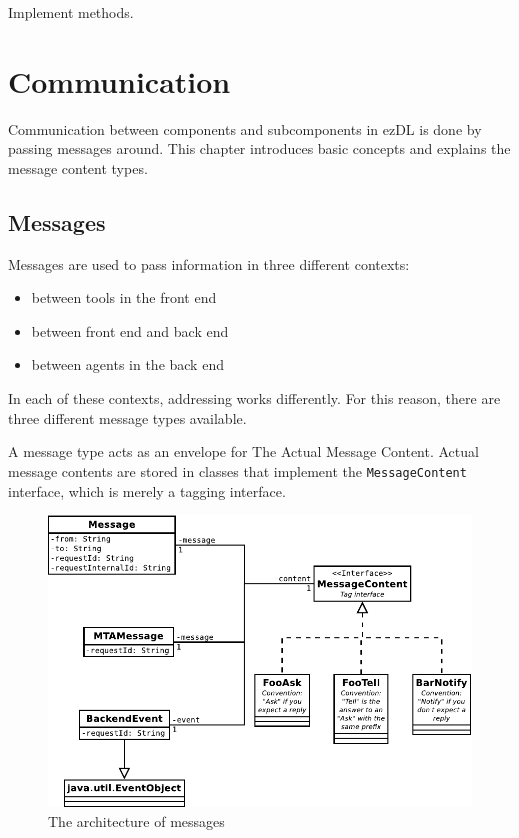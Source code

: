 \documentclass[12pt]{book}
\begin{document}
Implement methods.










%
%
%
%
%
\chapter{Communication}

Communication between components and subcomponents in ezDL is done by passing messages around. This chapter introduces basic concepts and explains the message content types.




\section{Messages\label{sec:communication:messages}}

Messages are used to pass information in three different contexts:

\begin{itemize}
\item between tools in the front end
\item between front end and back end
\item between agents in the back end
\end{itemize}

In each of these contexts, addressing works differently. For this reason, there are three different message types available. 

A message type acts as an envelope for The Actual Message Content. Actual message contents are stored in classes that implement the {\tt MessageContent} interface, which is merely a tagging interface.

\begin{figure}[t]
\begin{center}
  \includegraphics[width=.75\linewidth]{Message}
  \caption{The architecture of messages}
  \label{fig:messagearchitecture}
\end{center}
\end{figure}
\end{document}
